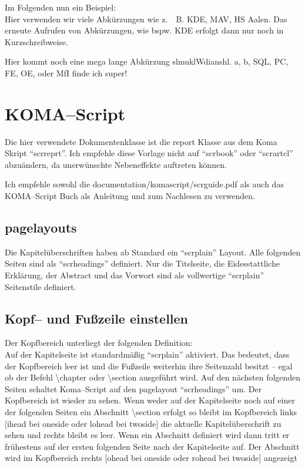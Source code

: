 		Im Folgenden nun ein Beispiel:	\\
		Hier verwenden wir viele Abkürzungen wie z.~\ B. \ac{KDE}, \ac{MAV}, \ac{HS} Aalen.
		Das erneute Aufrufen von Abkürzungen, wie bspw. \ac{KDE} erfolgt dann nur noch in Kurzschreibweise.
		
		Hier kommt noch eine mega lange Abkürzung \ac{slmuklWdianshl}.
		\ac{a}, \ac{b}, \ac{SQL}, \ac{PC}, \ac{FE}, \ac{OE}, oder \ac{MfI} finde ich super!
	
	
	\section{KOMA--Script}
		\label{sec:komascript}
		Die hier verwendete Dokumentenklasse ist die report Klasse aus dem Koma Skript \enquote{scrreprt}. 
		Ich empfehle diese Vorlage nicht auf \enquote{scrbook} oder \enquote{scrartcl} abzuändern, da unerwünschte Nebeneffekte auftreten können.
		
		Ich empfehle sowohl die documentation/komascript/scrguide.pdf als auch das KOMA--Script Buch \cite{Kohm2014} als Anleitung und zum Nachlesen zu verwenden.
	
		\subsection{pagelayouts}
			\label{subsec:pagelayouts}
			Die Kapitelüberschriften haben ab Standard ein \enquote{scrplain} Layout. Alle folgenden Seiten sind als \enquote{scrheadings} definiert. 
			Nur die Titelseite, die Eidesstattliche Erklärung, der Abstract und das Vorwort sind als vollwertige \enquote{scrplain} Seitenstile definiert.
	
		\subsection{Kopf-- und Fußzeile einstellen}
			\label{subsec:kopfundfusszeile}
			Der Kopfbereich unterliegt der folgenden Definition: \\Auf der Kapitelseite ist standardmäßig \enquote{scrplain} aktiviert. Das bedeutet, dass der Kopfbereich leer ist und die Fußzeile weiterhin ihre Seitenzahl besitzt -- egal ob der Befehl \textbackslash chapter oder \textbackslash section ausgeführt wird. Auf den nächsten folgenden Seiten schaltet Koma--Script auf den pagelayout \enquote{scrheadings} um. Der Kopfbereich ist wieder zu sehen. Wenn weder auf der Kapitelseite noch auf einer der folgenden Seiten ein Abschnitt \textbackslash section erfolgt so bleibt im Kopfbereich links $[$ihead bei oneside oder lohead bei twoside$]$ die aktuelle Kapitelüberschrift zu sehen und rechts bleibt es leer. Wenn ein Abschnitt definiert wird dann tritt er frühestens auf der ersten folgenden Seite nach der Kapitelseite auf. Der Abschnitt wird im Kopfbereich rechts $[$ohead bei oneside oder rohead bei twoside$]$ angezeigt
		
